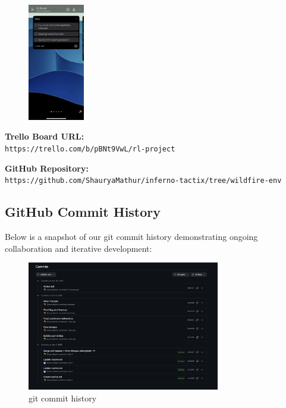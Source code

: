 \documentclass[conference]{IEEEtran}
\begin{document}
\vspace{-0.7cm}
\begin{figure}[H]
\centering
\includegraphics[width=0.22\textwidth]{5.jpg}
\end{figure}

\vspace{-0.3cm}
\noindent\textbf{Trello Board URL:} \\
\texttt{https://trello.com/b/pBNt9VwL/rl-project}

\vspace{0.3cm}
\noindent\textbf{GitHub Repository:} \\
\texttt{https://github.com/ShauryaMathur/inferno-tactix/tree/wildfire-env}

\subsection{GitHub Commit History}
\hspace{-0.4cm}Below is a snapshot of our git commit history demonstrating ongoing collaboration and iterative development:

\begin{figure}[H]
\centering
\includegraphics[width=0.75\textwidth]{6.png} 
\caption{git commit history}
\end{figure}
\end{document}
